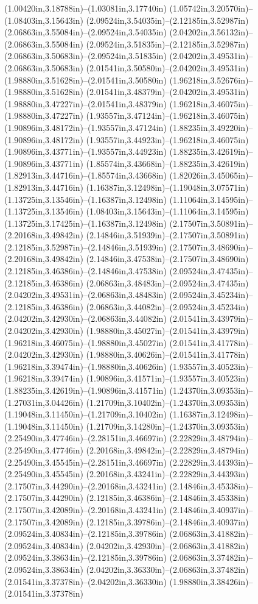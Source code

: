 (1.00420in,3.18788in)--(1.03081in,3.17740in) (1.05742in,3.20570in)--(1.08403in,3.15643in) (2.09524in,3.54035in)--(2.12185in,3.52987in) (2.06863in,3.55084in)--(2.09524in,3.54035in) (2.04202in,3.56132in)--(2.06863in,3.55084in) (2.09524in,3.51835in)--(2.12185in,3.52987in) (2.06863in,3.50683in)--(2.09524in,3.51835in) (2.04202in,3.49531in)--(2.06863in,3.50683in) (2.01541in,3.50580in)--(2.04202in,3.49531in) (1.98880in,3.51628in)--(2.01541in,3.50580in) (1.96218in,3.52676in)--(1.98880in,3.51628in) (2.01541in,3.48379in)--(2.04202in,3.49531in) (1.98880in,3.47227in)--(2.01541in,3.48379in) (1.96218in,3.46075in)--(1.98880in,3.47227in) (1.93557in,3.47124in)--(1.96218in,3.46075in) (1.90896in,3.48172in)--(1.93557in,3.47124in) (1.88235in,3.49220in)--(1.90896in,3.48172in) (1.93557in,3.44923in)--(1.96218in,3.46075in) (1.90896in,3.43771in)--(1.93557in,3.44923in) (1.88235in,3.42619in)--(1.90896in,3.43771in) (1.85574in,3.43668in)--(1.88235in,3.42619in) (1.82913in,3.44716in)--(1.85574in,3.43668in) (1.82026in,3.45065in)--(1.82913in,3.44716in) (1.16387in,3.12498in)--(1.19048in,3.07571in) (1.13725in,3.13546in)--(1.16387in,3.12498in) (1.11064in,3.14595in)--(1.13725in,3.13546in) (1.08403in,3.15643in)--(1.11064in,3.14595in) (1.13725in,3.17425in)--(1.16387in,3.12498in) (2.17507in,3.50891in)--(2.20168in,3.49842in) (2.14846in,3.51939in)--(2.17507in,3.50891in) (2.12185in,3.52987in)--(2.14846in,3.51939in) (2.17507in,3.48690in)--(2.20168in,3.49842in) (2.14846in,3.47538in)--(2.17507in,3.48690in) (2.12185in,3.46386in)--(2.14846in,3.47538in) (2.09524in,3.47435in)--(2.12185in,3.46386in) (2.06863in,3.48483in)--(2.09524in,3.47435in) (2.04202in,3.49531in)--(2.06863in,3.48483in) (2.09524in,3.45234in)--(2.12185in,3.46386in) (2.06863in,3.44082in)--(2.09524in,3.45234in) (2.04202in,3.42930in)--(2.06863in,3.44082in) (2.01541in,3.43979in)--(2.04202in,3.42930in) (1.98880in,3.45027in)--(2.01541in,3.43979in) (1.96218in,3.46075in)--(1.98880in,3.45027in) (2.01541in,3.41778in)--(2.04202in,3.42930in) (1.98880in,3.40626in)--(2.01541in,3.41778in) (1.96218in,3.39474in)--(1.98880in,3.40626in) (1.93557in,3.40523in)--(1.96218in,3.39474in) (1.90896in,3.41571in)--(1.93557in,3.40523in) (1.88235in,3.42619in)--(1.90896in,3.41571in) (1.24370in,3.09353in)--(1.27031in,3.04426in) (1.21709in,3.10402in)--(1.24370in,3.09353in) (1.19048in,3.11450in)--(1.21709in,3.10402in) (1.16387in,3.12498in)--(1.19048in,3.11450in) (1.21709in,3.14280in)--(1.24370in,3.09353in) (2.25490in,3.47746in)--(2.28151in,3.46697in) (2.22829in,3.48794in)--(2.25490in,3.47746in) (2.20168in,3.49842in)--(2.22829in,3.48794in) (2.25490in,3.45545in)--(2.28151in,3.46697in) (2.22829in,3.44393in)--(2.25490in,3.45545in) (2.20168in,3.43241in)--(2.22829in,3.44393in) (2.17507in,3.44290in)--(2.20168in,3.43241in) (2.14846in,3.45338in)--(2.17507in,3.44290in) (2.12185in,3.46386in)--(2.14846in,3.45338in) (2.17507in,3.42089in)--(2.20168in,3.43241in) (2.14846in,3.40937in)--(2.17507in,3.42089in) (2.12185in,3.39786in)--(2.14846in,3.40937in) (2.09524in,3.40834in)--(2.12185in,3.39786in) (2.06863in,3.41882in)--(2.09524in,3.40834in) (2.04202in,3.42930in)--(2.06863in,3.41882in) (2.09524in,3.38634in)--(2.12185in,3.39786in) (2.06863in,3.37482in)--(2.09524in,3.38634in) (2.04202in,3.36330in)--(2.06863in,3.37482in) (2.01541in,3.37378in)--(2.04202in,3.36330in) (1.98880in,3.38426in)--(2.01541in,3.37378in) 
